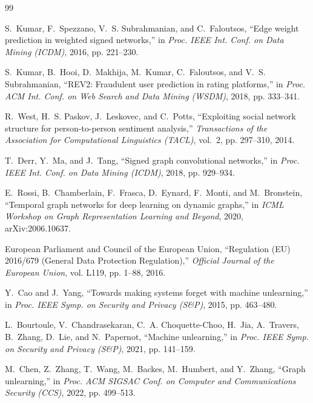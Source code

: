 \documentclass[lettersize,journal]{IEEEtran}
\begin{document}
\begin{thebibliography}{99}
\providecommand{\url}[1]{#1}
\providecommand{\newblock}{\relax}
\providecommand{\bibinfo}[2]{#2}

S.~Kumar, F.~Spezzano, V.~S. Subrahmanian, and C.~Faloutsos, ``Edge weight
  prediction in weighted signed networks,'' in \emph{Proc. IEEE
  Int. Conf. on Data Mining (ICDM)}, 2016, pp. 221--230.

S.~Kumar, B.~Hooi, D.~Makhija, M.~Kumar, C.~Faloutsos, and V.~S. Subrahmanian,
  ``{REV2}: Fraudulent user prediction in rating platforms,'' in
  \emph{Proc. ACM Int. Conf. on Web Search and Data
  Mining (WSDM)}, 2018, pp. 333--341.

R.~West, H.~S. Paskov, J.~Leskovec, and C.~Potts, ``Exploiting social network
  structure for person-to-person sentiment analysis,'' \emph{Transactions of
  the Association for Computational Linguistics (TACL)}, vol.~2, pp. 297--310,
  2014.

T.~Derr, Y.~Ma, and J.~Tang, ``Signed graph convolutional networks,'' in
  \emph{Proc. IEEE Int. Conf. on Data Mining
  (ICDM)}, 2018, pp. 929--934.

E.~Rossi, B.~Chamberlain, F.~Frasca, D.~Eynard, F.~Monti, and M.~Bronstein,
  ``Temporal graph networks for deep learning on dynamic graphs,'' in
  \emph{ICML Workshop on Graph Representation Learning and Beyond}, 2020,
  arXiv:2006.10637.

{European Parliament and Council of the European Union}, ``Regulation ({EU})
  2016/679 (General Data Protection Regulation),'' \emph{Official Journal of
  the European Union}, vol. L119, pp. 1--88, 2016.

Y.~Cao and J.~Yang, ``Towards making systems forget with machine unlearning,''
  in \emph{Proc. IEEE Symp. on Security and Privacy (S\&P)},
  2015, pp. 463--480.

L.~Bourtoule, V.~Chandrasekaran, C.~A. Choquette-Choo, H.~Jia, A.~Travers,
  B.~Zhang, D.~Lie, and N.~Papernot, ``Machine unlearning,'' in
  \emph{Proc. IEEE Symp. on Security and Privacy (S\&P)},
  2021, pp. 141--159.

M.~Chen, Z.~Zhang, T.~Wang, M.~Backes, M.~Humbert, and Y.~Zhang, ``Graph
  unlearning,'' in \emph{Proc. ACM SIGSAC Conf. on Computer
  and Communications Security (CCS)}, 2022, pp. 499--513.


\end{thebibliography}
\end{document}
